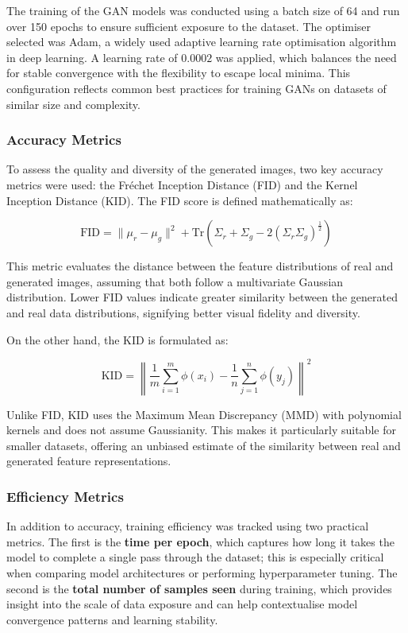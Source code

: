 The training of the GAN models was conducted using a batch size of 64 and run over 150 epochs to ensure sufficient exposure to the dataset. The optimiser selected was Adam, a widely used adaptive learning rate optimisation algorithm in deep learning. A learning rate of $0.0002$ was applied, which balances the need for stable convergence with the flexibility to escape local minima. This configuration reflects common best practices for training GANs on datasets of similar size and complexity.

\subsubsection{Accuracy Metrics}

To assess the quality and diversity of the generated images, two key accuracy metrics were used: the Fréchet Inception Distance (FID) and the Kernel Inception Distance (KID). The FID score is defined mathematically as:

\begin{equation}
\text{FID} = \lVert \mu_r - \mu_g \rVert^2 + \text{Tr} \left( \Sigma_r + \Sigma_g - 2 (\Sigma_r \Sigma_g)^{\frac{1}{2}} \right)
\end{equation}

This metric evaluates the distance between the feature distributions of real and generated images, assuming that both follow a multivariate Gaussian distribution. Lower FID values indicate greater similarity between the generated and real data distributions, signifying better visual fidelity and diversity.

On the other hand, the KID is formulated as:

\begin{equation}
\text{KID} = \left\lVert \frac{1}{m} \sum_{i=1}^{m} \phi(x_i) - \frac{1}{n} \sum_{j=1}^{n} \phi(y_j) \right\rVert^2
\end{equation}

Unlike FID, KID uses the Maximum Mean Discrepancy (MMD) with polynomial kernels and does not assume Gaussianity. This makes it particularly suitable for smaller datasets, offering an unbiased estimate of the similarity between real and generated feature representations.

\subsubsection{Efficiency Metrics}

In addition to accuracy, training efficiency was tracked using two practical metrics. The first is the \textbf{time per epoch}, which captures how long it takes the model to complete a single pass through the dataset; this is especially critical when comparing model architectures or performing hyperparameter tuning. The second is the \textbf{total number of samples seen} during training, which provides insight into the scale of data exposure and can help contextualise model convergence patterns and learning stability.

